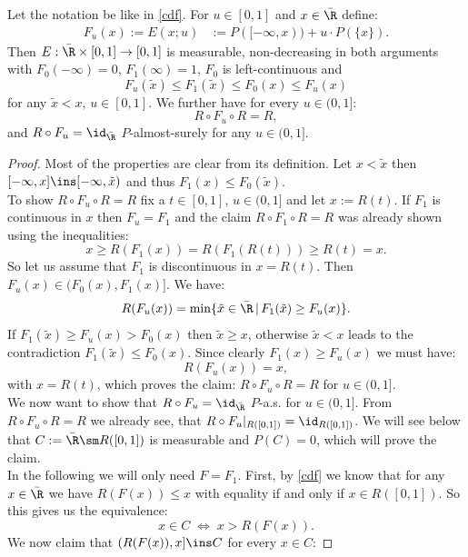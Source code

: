 \begin{Lem}
    \label{u-cdf}
    Let the notation be like in \ref{cdf}. For $u \in [0,1]$ and $x \in \bar\R$ define:
    \begin{align*}
        F_u(x) := E(x;u) &:= P([-\infty,x))+u \cdot P(\{x\}).
    \end{align*}
    Then $E: \bar \R \times [0,1] \to [0,1]$ is measurable, non-decreasing in both arguments with $F_0(-\infty)=0$, $F_1(\infty)=1$, $F_0$ is left-continuous and 
    \[F_u(\tilde x) \le F_1(\tilde x) \le F_0(x) \le F_u(x)\]
    for any $\tilde x < x$, $u \in [0,1]$. 
    We further have for every $u \in (0,1]$:
    \[ R \circ F_u \circ R = R,\]
    and $R \circ F_u = \id_{\bar\R}$ $P$-almost-surely for any $u \in (0,1]$.
\begin{proof}
    Most of the properties are clear from its definition.
    Let $ x< \tilde x$ then $[-\infty,x] \ins [-\infty,\tilde x)$ and thus $F_1(x) \le F_0(\tilde x)$.\\ 
    To show $R \circ F_u \circ R = R$ fix a $t \in [0,1]$, $u \in (0,1]$ and let $x:=R(t)$. If $F_1$ is continuous in $x$ then $F_u = F_1$ and the claim $R\circ F_1 \circ R=R$ was already shown using the inequalities:
\[ x \ge R(F_1(x)) = R ( F_1(R(t))) \ge R(t)=x.\]
    So let us assume that $F_1$ is discontinuous in $x=R(t)$.
    Then $F_u(x) \in (F_0(x),F_1(x)]$. We have:
    \[    R(F_u(x)) = \min \{ \tilde x \in \bar\R\,|\, F_1(\tilde x) \ge F_u(x)  \}. \]
    If $F_1(\tilde x) \ge F_u(x) > F_0(x)$ then $\tilde x \ge x$, otherwise $\tilde x < x$ leads to the contradiction $F_1(\tilde x) \le F_0(x)$. Since clearly $F_1(x) \ge F_u(x)$ we must have:
    \[ R(F_u(x)) = x,\]
    with $x=R(t)$, which proves the claim: $R \circ F_u \circ R = R$ for $u \in (0,1]$.\\
 We now want to show that $R \circ F_u = \id_{\bar\R}$ $P$-a.s. for $u \in (0,1]$.
From $R \circ F_u \circ R =R$ we already see, that $R \circ F_u|_{R([0,1])} = \id_{R([0,1])}$. 
We will see below that $C:=\bar \R \sm R([0,1])$ is measurable and $P(C) =0$, which will prove the claim.\\
In the following we will only need $F=F_1$.
First, by \ref{cdf} we know that for any $x \in\bar\R$ we have $R(F(x)) \le x$ with equality if and only if $x \in R([0,1])$. So this gives us the equivalence:
\[ x \in C \; \iff\;x > R(F(x)).\]
We now claim that $(R(F(x)),x] \ins C$ for every $x \in C$:

\end{proof}
\end{Lem}
